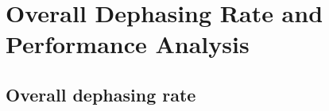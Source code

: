 \chapter{Overall Dephasing Rate and Performance Analysis}
\label{chap:overall_dephasing}

\section{Overall dephasing rate}
\label{sec3}






